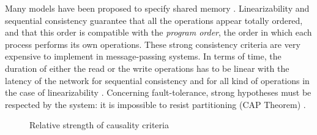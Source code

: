 \documentclass[9pt,numbers]{sigplanconf}
\begin{document}
Many models have been proposed to specify shared memory \cite{adve1996shared}.
Linearizability \cite{herlihy1990linearizability} and sequential consistency \cite{lamport1979make} 
guarantee that all the operations appear totally ordered, and that this order is compatible with
the \emph{program order}, the order in which each process performs its own operations.
These strong consistency criteria are very expensive to implement in message-passing systems.
In terms of time, the duration of either the read or the write operations has to be linear with the latency of the network for sequential consistency \cite{lipton1988pram} and for all kind of operations in the case of linearizability \cite{attiya1994sequential}.
Concerning fault-tolerance, strong hypotheses must be respected by the system: 
it is impossible to resist partitioning (CAP Theorem) \cite{gilbert2002brewer}.

\begin{figure*}
  \centering
  \caption{Relative strength of causality criteria}
  \label{fig:sum_up_criteria}
\end{figure*}
\end{document}
